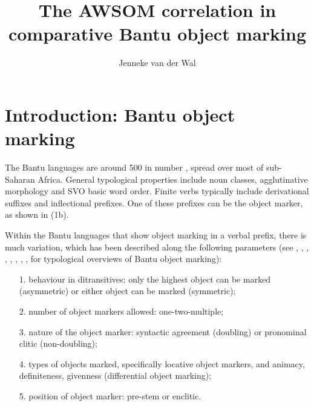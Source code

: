 \documentclass[output=paper
,modfonts
,nonflat]{langsci/langscibook}
\title{The AWSOM correlation in comparative Bantu object marking}
\author{%
	Jenneke van der Wal \affiliation {Leiden University Centre for Linguistics} 
}
\begin{document}
	
\maketitle	
\section{Introduction: Bantu object marking}


The Bantu languages are around 500 in number \citep[1]{Nurse_Philippson2003}, spread over most of sub-Saharan Africa. General typological properties include noun classes, agglutinative morphology and SVO basic word order. Finite verbs typically include derivational suffixes and inflectional prefixes. One of these prefixes can be the object marker, as shown in (1b).

Within the Bantu languages that show object marking in a verbal prefix, there is much variation, which has been described along the following parameters (see \citealt{Zeller2014}, \citealt{Marlo2015}, \citealt{Marten_Kula2012}, \citealt{Riedel2009}, \citealt{Marten_et_al2007}, \citealt{Beaudoin-Lietz_et_al2004}, \citealt{Morimoto2002}, \citealt{Polak1986}, \citealt{Hyman_Duranti1982} for typological overviews of Bantu object marking):
\begin{enumerate}
\item[1.]behaviour in ditransitives: only the highest object can be marked (asymmetric) or either object can be marked (symmetric); 
\item[2.]number of object markers allowed: one-two-multiple;
\item[3.]nature of the object marker: syntactic agreement (doubling) or pronominal clitic (non-doubling);
\item[4.]types of objects marked, specifically locative object markers, and animacy, definiteness, givenness (differential object marking);
\item [5.]position of object marker: pre-stem or enclitic.
\end{enumerate}
\end{document}
